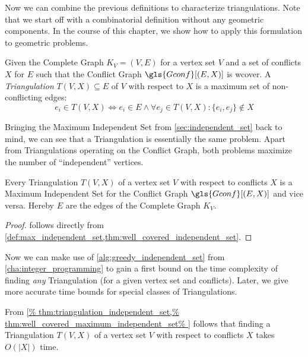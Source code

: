 Now we can combine the previous definitions to characterize
triangulations. Note that we start off with a combinatorial
definition without any geometric components. In the course of this
chapter, we show how to apply this formulation to geometric problems.

\begin{definition}[Triangulation]
  Given the Complete Graph \(K_V = (V,E)\) for a vertex set \(V\)
  and a set of conflicts \(X\) for \(E\)
  such that the Conflict Graph \(\gls{Gconf}[(E,X)]\) is \gls{wcover}.
  A \emph{Triangulation} \(T(V,X) \subseteq E\) of \(V\) with respect
  to \(X\) is a maximum set of non-conflicting edges:
  \[
    e_i \in T(V,X)
    \iff e_i \in E
    \land \forall e_j \in T(V,X) : \{e_i,e_j\} \not\in X
  \]
\end{definition}

Bringing the Maximum Independent Set from \cref{sec:independent_set}
back to mind, we can see that a Triangulation is essentially the same
problem. Apart from Triangulations operating on the Conflict Graph,
both problems maximize the number of ``independent'' vertices.

\begin{theorem}
  \label{thm:triangulation_independent_set}
  Every Triangulation \(T(V,X)\) of a vertex set \(V\) with respect
  to conflicts \(X\) is a Maximum Independent Set for the Conflict
  Graph \(\gls{Gconf}[(E,X)]\) and vice versa. Hereby \(E\) are the
  edges of the Complete Graph \(K_V\).
  \begin{proof}
     follows directly from
    \cref{def:max_independent_set,thm:well_covered_independent_set}.
  \end{proof}
\end{theorem}

Now we can make use of \cref{alg:greedy_independent_set} from
\cref{cha:integer_programming} to gain a first bound on the time
complexity of finding \emph{any} Triangulation (for a given vertex
set and conflicts). Later, we give more accurate time bounds for
special classes of Triangulations.

\begin{theorem}
  \label{thm:time_complexity_triangulations}
  From
  \cref{%
    thm:triangulation_independent_set,%
    thm:well_covered_maximum_independent_set%
  }
  follows that finding a Triangulation \(T(V,X)\) of a vertex set
  \(V\) with respect to conflicts \(X\) takes \(O(|X|)\) time.
\end{theorem}

